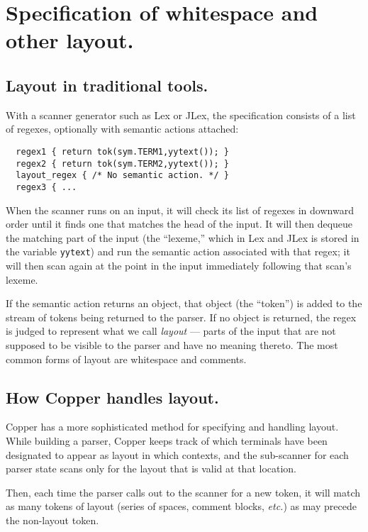 \documentclass[12pt,english,twoside]{report}
\begin{document}
\section{\label{sec:Custom-layout.}Specification of whitespace and other
layout.}


\subsection{Layout in traditional tools.}

With a scanner generator such as Lex or JLex, the specification consists
of a list of regexes, optionally with semantic actions attached:

\begin{verbatim}
  regex1 { return tok(sym.TERM1,yytext()); }
  regex2 { return tok(sym.TERM2,yytext()); }
  layout_regex { /* No semantic action. */ }
  regex3 { ...
\end{verbatim}

When the scanner runs on an input, it will check its list of regexes
in downward order until it finds one that matches the head of the
input. It will then dequeue the matching part of the input (the {}``lexeme,''
which in Lex and JLex is stored in the variable \texttt{yytext}) and
run the semantic action associated with that regex; it will then scan
again at the point in the input immediately following that scan's
lexeme.

If the semantic action returns an object, that object (the {}``token'')
is added to the stream of tokens being returned to the parser. If
no object is returned, the regex is judged to represent what we call
\emph{layout} --- parts of the input that are not supposed to be visible
to the parser and have no meaning thereto. The most common forms of
layout are whitespace and comments.


\subsection{How Copper handles layout.}

Copper has a more sophisticated method for specifying and handling
layout. While building a parser, Copper keeps track of which terminals
have been designated to appear as layout in which contexts, and the
sub-scanner for each parser state scans only for the layout that is
valid at that location.

Then, each time the parser calls out to the scanner for a new token,
it will match as many tokens of layout (series of spaces, comment
blocks, \emph{etc.}) as may precede the non-layout token.
\end{document}
